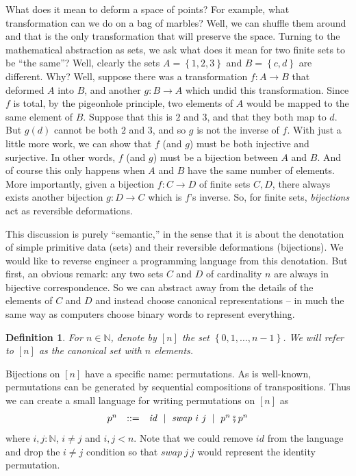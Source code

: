 \documentclass{article}
\newtheorem{defn}{Definition}[section]
\newcommand{\fin}[1]{\ensuremath{\left[#1\right]}}
\newcommand{\Nat}{\ensuremath{\mathbb{N}}}
\begin{document}
What does it mean to deform a space of points? For example, what
transformation can we do on a bag of marbles? Well, we can shuffle
them around and that is the only transformation that will preserve the
space. Turning to the mathematical abstraction as sets, we ask what
does it mean for two finite sets to be ``the same''?  Well, clearly
the sets $A = \left\{1, 2, 3\right\}$ and $B = \left\{c, d\right\}$
are different.  Why?  Well, suppose there was a transformation
$f : A \rightarrow B$ that deformed $A$ into $B$, and another
$g : B \rightarrow A$ which undid this transformation. Since $f$ is
total, by the pigeonhole principle, two elements of $A$ would be
mapped to the same element of $B$. Suppose that this is $2$ and $3$,
and that they both map to $d$.  But $g(d)$ cannot be both $2$ and $3$,
and so $g$ is not the inverse of $f$. With just a little more work, we
can show that $f$ (and $g$) must be both injective and surjective. In
other words, $f$ (and $g$) must be a bijection between $A$ and $B$.
And of course this only happens when $A$ and $B$ have the same number
of elements. More importantly, given a bijection $f : C \rightarrow D$
of finite sets $C,D$, there always exists another bijection
$g : D \rightarrow C$ which is $f$'s inverse. So, for finite sets,
\emph{bijections} act as reversible deformations.

This discussion is purely ``semantic,'' in the sense that it is about
the denotation of simple primitive data (sets) and their reversible
deformations (bijections).  We would like to reverse engineer a programming
language from this denotation. But first, an obvious remark: any two sets
$C$ and $D$ of cardinality $n$ are always in bijective correspondence. So
we can abstract away from the details of the elements of $C$ and $D$ and
instead choose canonical representations -- in much the same way as computers
choose binary words to represent everything.

\begin{defn} For $n\in\Nat$, denote by $\fin{n}$ the set
$\left\{0,1,\ldots,n-1\right\}$.
We will refer to $\fin{n}$ as the canonical set with $n$ elements.
\end{defn}

Bijections on \fin{n} have a specific name: permutations. As is
well-known, permutations can be generated by sequential compositions of
transpositions. Thus we can create a small language for writing
permutations on $\fin{n}$ as
\[\begin{array}{rcl}
p^n &::=& \mathit{id} ~\mid~ \mathit{swap}~i~j ~\mid~ p^n \fatsemi p^n
  \end{array}\]
where $i,j:\Nat$, $i\neq j$ and $i,j < n$. Note that we could remove
$\mathit{id}$ from the language and drop the $i\neq j$ condition so that
$\mathit{swap}~j~j$ would represent the identity permutation.
\end{document}
